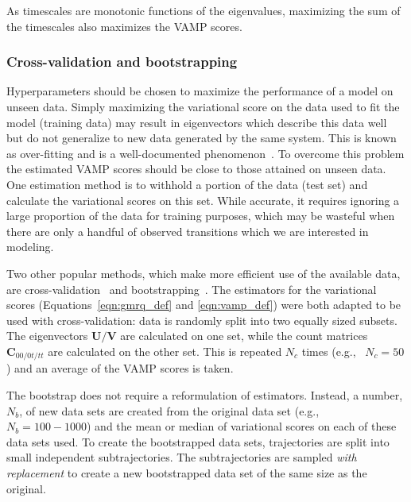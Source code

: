 \documentclass[journal=jacsat,manuscript=article]{achemso}
\begin{document}
As timescales are monotonic functions of the eigenvalues, maximizing the sum of the timescales also maximizes the VAMP scores. 


\subsubsection{Cross-validation and bootstrapping}

Hyperparameters should be chosen to maximize the performance of a model on unseen data. Simply maximizing the variational score on the data used to fit the model (training data) may result in eigenvectors which describe this data well but do not generalize to new data generated by the same system. This is known as over-fitting and is a well-documented phenomenon~\cite{friedman2001elements}. To overcome this problem the estimated VAMP scores should be close to those attained on unseen data. One estimation method is to withhold a portion of the data (test set) and calculate the variational scores on this set. While accurate, it requires ignoring a large proportion of the data for training purposes, which may be wasteful when there are only a handful of observed transitions which we are interested in modeling. 

Two other popular methods, which make more efficient use of the available data,  are cross-validation~\cite{arlotSurveyCrossvalidationProcedures2009} and bootstrapping~\cite{efronIntroductionBootstrap1993}. The estimators for the variational scores (Equations~\ref{eqn:gmrq_def} and \ref{eqn:vamp_def}) were both adapted to be used with cross-validation\cite{wuVariationalApproachLearning2020c, mcgibbonVariationalCrossvalidationSlow2015}: data is randomly split into two equally sized subsets. The eigenvectors $\mathbf{U}/\mathbf{V}$ are calculated on one set, while the count matrices $\mathbf{C}_{00/0t/tt}$ are calculated on the other set.  This is repeated $N_c$ times (e.g.,~\cite{scherer_variational_2019} $N_c =50$) and an average of the VAMP scores is taken.

The bootstrap does not require a reformulation of estimators. Instead, a number, $N_b$, of new data sets are created from the original data set (e.g.,~\cite{efronIntroductionBootstrap1993} $N_b = 100 - 1000$) and the mean or median of variational scores on each of these data sets used. To create the bootstrapped data sets, 
trajectories are split into small independent subtrajectories. The subtrajectories are sampled \emph{with replacement} to create a new bootstrapped data set of the same size as the original. 
\end{document}
